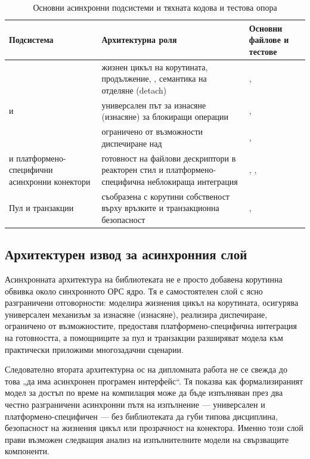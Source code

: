 \begin{table}[H]
\centering
\small
\caption{Основни асинхронни подсистеми и тяхната кодова и тестова опора}
\label{tab:async_subsystem_evidence}
\begin{tabularx}{\textwidth}{L{2.9cm}L{4.3cm}Z}
\toprule
\textbf{Подсистема} & \textbf{Архитектурна роля} & \textbf{Основни файлове и тестове} \\
\midrule
{} & жизнен цикъл на корутината, продължение, , семантика на отделяне (detach) & ,  \\
 и  & универсален път за изнасяне (изнасяне) за блокиращи операции & ,  \\
 & ограничено от възможности диспечиране над  & ,  \\
 и платформено-специфични асинхронни конектори & готовност на файлови дескриптори в реакторен стил и платформено-специфична неблокираща интеграция & , ,  \\
Пул и транзакции & съобразена с корутини собственост върху връзките и транзакционна безопасност & ,  \\
\bottomrule
\end{tabularx}
\end{table}

\subsection{Архитектурен извод за асинхронния слой}

Асинхронната архитектура на библиотеката не е просто добавена корутинна обвивка около синхронното ОРС ядро. Тя е самостоятелен слой с ясно разграничени отговорности:  моделира жизнения цикъл на корутината,  осигурява универсален механизъм за изнасяне (изнасяне),  реализира диспечиране, ограничено от възможностите,  предоставя платформено-специфична интеграция на готовността, а помощниците за пул и транзакции разширяват модела към практически приложими многозадачни сценарии.

Следователно втората архитектурна ос на дипломната работа не се свежда до това „да има асинхронен програмен интерфейс“. Тя показва как формализираният модел за достъп по време на компилация може да бъде изпълняван през два честно разграничени асинхронни пътя на изпълнение --- универсален и платформено-специфичен --- без библиотеката да губи типова дисциплина, безопасност на жизнения цикъл или прозрачност на конектора. Именно този слой прави възможен следващия анализ на изпълнителните модели на свързващите компоненти.
